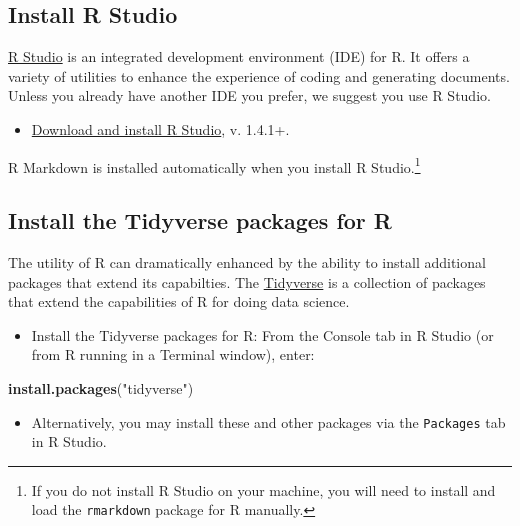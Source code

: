 \documentclass[
]{book}
\newenvironment{Shaded}{\begin{snugshade}}{\end{snugshade}}
\newcommand{\KeywordTok}[1]{\textcolor[rgb]{0.13,0.29,0.53}{\textbf{#1}}}
\newcommand{\NormalTok}[1]{#1}
\newcommand{\StringTok}[1]{\textcolor[rgb]{0.31,0.60,0.02}{#1}}
\providecommand{\tightlist}{%
  \setlength{\itemsep}{0pt}\setlength{\parskip}{0pt}}
\begin{document}
\hypertarget{install-r-studio}{%
\subsection{Install R Studio}\label{install-r-studio}}

\href{https://rstudio.com/products/rstudio/}{R Studio} is an integrated development environment (IDE) for R. It offers a variety of utilities to enhance the experience of coding and generating documents. Unless you already have another IDE you prefer, we suggest you use R Studio.

\begin{itemize}
\tightlist
\item
  \href{https://rstudio.com/products/rstudio/download/\#download}{Download and install R Studio}, v. 1.4.1+.
\end{itemize}

R Markdown is installed automatically when you install R Studio.\footnote{If you do not install R Studio on your machine, you will need to install and load the \texttt{rmarkdown} package for R manually.}

\hypertarget{install-the-tidyverse-packages-for-r}{%
\subsection{Install the Tidyverse packages for R}\label{install-the-tidyverse-packages-for-r}}

The utility of R can dramatically enhanced by the ability to install additional packages that extend its capabilties. The \href{https://www.tidyverse.org/}{Tidyverse} is a collection of packages that extend the capabilities of R for doing data science.

\begin{itemize}
\tightlist
\item
  Install the Tidyverse packages for R: From the Console tab in R Studio (or from R running in a Terminal window), enter:
\end{itemize}

\begin{Shaded}
\begin{Highlighting}[]
\KeywordTok{install.packages}\NormalTok{(}\StringTok{"tidyverse"}\NormalTok{)}
\end{Highlighting}
\end{Shaded}

\begin{itemize}
\tightlist
\item
  Alternatively, you may install these and other packages via the \texttt{Packages} tab in R Studio.
\end{itemize}
\end{document}
